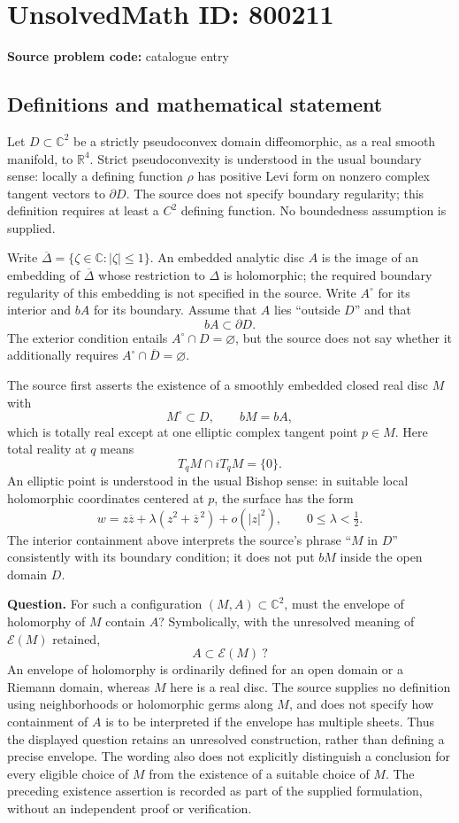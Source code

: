 \documentclass[11pt]{article}
\newcommand{\R}{\mathbb{R}}
\newcommand{\C}{\mathbb{C}}
\begin{document}
\section*{UnsolvedMath ID: 800211}
\textbf{Source problem code:} catalogue entry
\subsection{Definitions and mathematical statement}
Let \(D\subset\C^2\) be a strictly pseudoconvex domain diffeomorphic, as a real smooth manifold, to \(\R^4\). Strict pseudoconvexity is understood in the usual boundary sense: locally a defining function \(\rho\) has positive Levi form on nonzero complex tangent vectors to \(\partial D\). The source does not specify boundary regularity; this definition requires at least a \(C^2\) defining function. No boundedness assumption is supplied.

Write \(\overline\Delta=\{\zeta\in\C:|\zeta|\leq1\}\). An embedded analytic disc \(A\) is the image of an embedding of \(\overline\Delta\) whose restriction to \(\Delta\) is holomorphic; the required boundary regularity of this embedding is not specified in the source. Write \(A^\circ\) for its interior and \(bA\) for its boundary. Assume that \(A\) lies ``outside \(D\)'' and that
\[
 bA\subset\partial D.
\]
The exterior condition entails \(A^\circ\cap D=\varnothing\), but the source does not say whether it additionally requires \(A^\circ\cap\overline D=\varnothing\).

The source first asserts the existence of a smoothly embedded closed real disc \(M\) with
\[
 M^\circ\subset D,\qquad bM=bA,
\]
which is totally real except at one elliptic complex tangent point \(p\in M\). Here total reality at \(q\) means
\[
 T_qM\cap iT_qM=\{0\}.
\]
An elliptic point is understood in the usual Bishop sense: in suitable local holomorphic coordinates centered at \(p\), the surface has the form
\[
 w=z\overline z+\lambda(z^2+\overline z^{\,2})+o(|z|^2),
 \qquad 0\leq\lambda<\tfrac12.
\]
The interior containment above interprets the source's phrase ``\(M\) in \(D\)'' consistently with its boundary condition; it does not put \(bM\) inside the open domain \(D\).

\textbf{Question.} For such a configuration \((M,A)\subset\C^2\), must the envelope of holomorphy of \(M\) contain \(A\)? Symbolically, with the unresolved meaning of \(\mathcal E(M)\) retained,
\[
 A\subset\mathcal E(M)\ ?
\]
An envelope of holomorphy is ordinarily defined for an open domain or a Riemann domain, whereas \(M\) here is a real disc. The source supplies no definition using neighborhoods or holomorphic germs along \(M\), and does not specify how containment of \(A\) is to be interpreted if the envelope has multiple sheets. Thus the displayed question retains an unresolved construction, rather than defining a precise envelope. The wording also does not explicitly distinguish a conclusion for every eligible choice of \(M\) from the existence of a suitable choice of \(M\). The preceding existence assertion is recorded as part of the supplied formulation, without an independent proof or verification.
\end{document}

